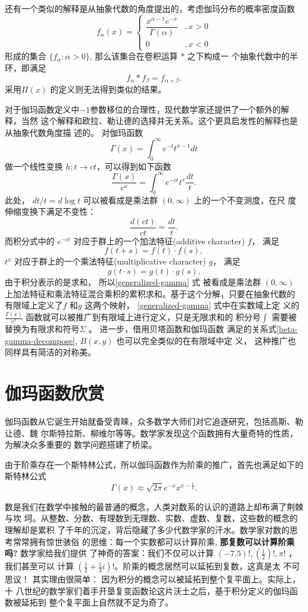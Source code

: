 {还有一个类似的解释是从抽象代数的角度提出的，考虑伽玛分布的概率密度函数
$$ f_\alpha(x)=\begin{cases} \dfrac{x^{\alpha-1} e^{-x}}{\Gamma(\alpha)} 
& , x>0 \\[12pt] 0 & , x<0 \end{cases} $$
形成的集合 $\{f_\alpha : \alpha > 0\}$, 那么该集合在卷积运算 $*$ 之下构成一
个抽象代数中的半环，即满足
$$ f_\alpha * f_\beta = f_{\alpha+\beta} .$$
采用$\Pi(x)$ 的定义则无法得到类似的结果。 


对于伽玛函数定义中$-1$参数移位的合理性，现代数学家还提供了一个额外的解释，当然
这个解释和欧拉、勒让德的选择并无关系。这个更具启发性的解释也是从抽象代数角度描
述的。 对伽玛函数
$$ \Gamma(x) = \int_0^{\infty} e^{-t}t^{x-1}dt $$
做一个线性变换 $h: t \rightarrow ct$，可以得到如下函数
\begin{equation}
\label{generalized-gamma}
\frac{\Gamma(x)}{c^x}  = \int_0^{\infty} e^{-ct} t^x \frac{dt}{t} . 
\end{equation}
此处， $dt/t = d \log t$ 可以被看成是乘法群 $(0, \infty)$ 上的一个不变测度，在尺
度伸缩变换下满足不变性：
$$ \frac{d(ct)}{ct} = \frac{dt}{t} .$$
而积分式中的 $e^{-ct}$ 对应于群上的一个加法特征(additive character) $f$， 满足 
$$f(t+s) =f(t) \cdot f(s) ,$$ 
$t^x$ 对应于群上的一个乘法特征(multiplicative character) $g$， 满足
$$g(t \cdot s) = g(t) \cdot g(s) .$$
由于积分表示的是求和， 所以\eqref{generalized-gamma} 式 被看成是乘法群 $(0,
\infty)$ 上加法特征和乘法特征混合乘积的累积求和。基于这个分解，只要在抽象代数的
有限域上定义了$f$ 和$g$ 这两个映射， \eqref{generalized-gamma} 式中在实数域上定
义的$\frac{\Gamma(x)}{c^x}$ 函数就可以被推广到有限域上进行定义，只是无限求和的
积分号$\int$ 需要被替换为有限求和符号$\Sigma$ 。 进一步，借用贝塔函数和伽玛函数
满足的关系式\eqref{beta-gamma-decompose}, $B(x,y)$ 也可以完全类似的在有限域中定
义， 这种推广也同样具有简洁的对称美。


\section{伽玛函数欣赏}

伽玛函数从它诞生开始就备受青睐，众多数学大师们对它追逐研究，包括高斯、勒让德、魏
尔斯特拉斯、柳维尔等等。数学家发现这个函数拥有大量奇特的性质，为解决众多重要的
数学问题搭建了桥梁。 

由于阶乘存在一个斯特林公式，所以伽玛函数作为阶乘的推广，首先也满足如下的斯特林公式
$$ \Gamma(x) \approx \sqrt{2\pi}e^{-x}x^{x-\frac{1}{2}} .$$

数是我们在数学中接触的最普通的概念，人类对数系的认识的道路上却布满了荆棘与坎
坷。从整数、分数、有理数到无理数、实数、虚数、复数，这些数的概念的理解却是累积
了千年的沉淀，背后隐藏了多少代数学家的汗水。数学家对数的思考常常拥有惊世骇俗
的思维：每一个实数都可以计算阶乘, {\bf 那复数可以计算阶乘吗?} 数学家给我们提供
了神奇的答案：我们不仅可以计算 $ (-7.5)!, (\frac{1}{2})!,\pi !$ ，我们甚至可以
计算 $(\frac{1}{2} + \frac{1}{3}i)!$。阶乘的概念居然可以延拓到复数，这真是太
不可思议！ 其实理由很简单： 因为积分的概念可以被延拓到整个复平面上。实际上，十
八世纪的数学家们着手开垦复变函数论这片沃土之后，基于积分定义的伽玛函数被延拓到
整个复平面上自然就不足为奇了。


}
